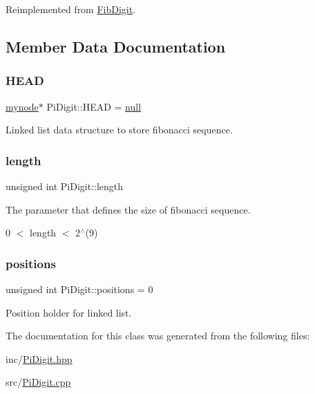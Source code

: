 Reimplemented from \mbox{\hyperlink{classFibDigit_a6972af3a7b3a3ebd480655e9ea721b25}{Fib\+Digit}}.



\subsection{Member Data Documentation}
\mbox{\label{classPiDigit_acd2ff3ad1661062acf9a0fd1446e2fbe}} 
\subsubsection{\texorpdfstring{H\+E\+AD}{HEAD}}
{\footnotesize\ttfamily \mbox{\hyperlink{structPiDigit_1_1mynode}{mynode}}$\ast$ Pi\+Digit\+::\+H\+E\+AD = \mbox{\hyperlink{FibDigit_8hpp_ac97b8ee753e4405397a42ad5799b0f9e}{null}}\hspace{0.3cm}{\ttfamily [private]}}



Linked list data structure to store fibonacci sequence. 

\mbox{\label{classPiDigit_adeaaf0996ef9c846df7ba38b4949ad99}} 
\subsubsection{\texorpdfstring{length}{length}}
{\footnotesize\ttfamily unsigned int Pi\+Digit\+::length\hspace{0.3cm}{\ttfamily [private]}}



The parameter that defines the size of fibonacci sequence. 

0 $<$ length $<$ 2$^\wedge$(9) \mbox{\label{classPiDigit_a2ddc1d48a6436aa32ba4ac5a4567d50c}} 
\subsubsection{\texorpdfstring{positions}{positions}}
{\footnotesize\ttfamily unsigned int Pi\+Digit\+::positions = 0\hspace{0.3cm}{\ttfamily [private]}}



Position holder for linked list. 



The documentation for this class was generated from the following files\+:\begin{DoxyCompactItemize}
\item 
inc/\mbox{\hyperlink{PiDigit_8hpp}{Pi\+Digit.\+hpp}}\item 
src/\mbox{\hyperlink{PiDigit_8cpp}{Pi\+Digit.\+cpp}}\end{DoxyCompactItemize}
